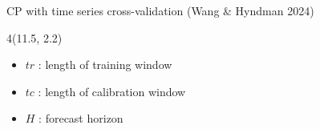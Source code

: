 \documentclass[
  12pt,
  ignorenonframetext,
  aspectratio=169,
]{beamer}
\begin{document}
\begin{frame}{CP with time series cross-validation (Wang \& Hyndman
2024)}
\label{cp-with-time-series-cross-validation-wang-hyndman-2024}

\begin{textblock}{4}(11.5, 2.2)
\fontsize{11}{12}\sf
\begin{block}{}
  \begin{itemize}
  \item \color{violet} {$tr$} : \color{black} length of training window \newline
  \item \color{violet} {$tc$} : \color{black} length of calibration window \newline
  \item \color{violet} {$H$} : \color{black} forecast horizon \newline
\end{itemize}
\end{block}
\end{textblock}
\end{frame}
\end{document}
